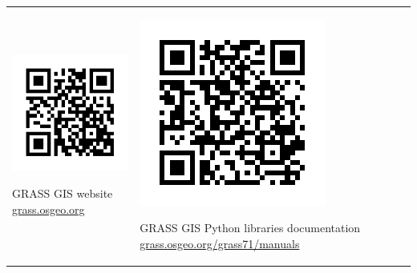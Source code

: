 \documentclass[innermargin=10mm]{tikzposter}
\begin{document}
\begin{columns}
{\newcommand{\qrcodewidth}{1\linewidth}
\hspace{-0.02\linewidth}
\begin{tabular}{lll}
\begin{minipage}{0.1\linewidth}
\includegraphics[height=\qrcodewidth]{grass_osgeo_org}
\end{minipage}
\begin{minipage}{0.27\linewidth}
GRASS GIS website\newline
\url{grass.osgeo.org}
\end{minipage}
&
\begin{minipage}{0.1\linewidth}
\includegraphics[height=\qrcodewidth]{python_doc}
\end{minipage}
\begin{minipage}{0.45\linewidth}
GRASS GIS Python libraries documentation\newline
\url{grass.osgeo.org/grass71/manuals}
\end{minipage}

\end{tabular}


}

\end{columns}
\end{document}
